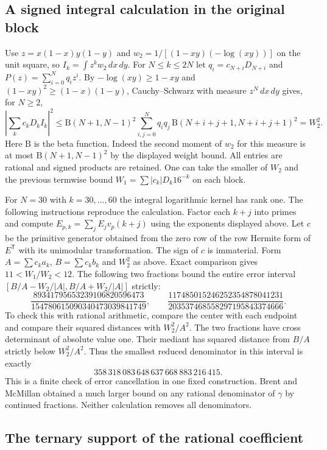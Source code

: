 \documentclass[11pt,a4paper]{article}
\theoremstyle{definition}\newtheorem{definition}[theorem]{Definition}\newtheorem{example}[theorem]{Example}
\theoremstyle{remark}\newtheorem{remark}[theorem]{Remark}
\begin{document}
\subsection{A signed integral calculation in the original block}
Use $z=x(1-x)y(1-y)$ and $w_2=1/[(1-xy)(-\log(xy))]$ on the unit square, so $I_k=\int z^k w_2\,dx\,dy$. For $N\le k\le2N$ let $q_i=c_{N+i}D_{N+i}$ and $P(z)=\sum_{i=0}^Nq_i z^i$. By $-\log(xy)\ge1-xy$ and $(1-xy)^2\ge(1-x)(1-y)$, Cauchy--Schwarz with measure $z^N\,dx\,dy$ gives, for $N\ge2$,
\[
 \left|\sum_k c_kD_k I_k\right|^2
 \le \mathrm B(N+1,N-1)^2
 \sum_{i,j=0}^N q_iq_j\,\mathrm B(N+i+j+1,N+i+j+1)^2
 = W_2^2 .
\]
Here $\mathrm B$ is the beta function. Indeed the second moment of $w_2$ for this measure is at most $\mathrm B(N+1,N-1)^2$ by the displayed weight bound. All entries are rational and signed products are retained. One can take the smaller of $W_2$ and the previous termwise bound $W_1=\sum |c_k|D_k16^{-k}$ on each block.

For $N=30$ with $k=30,\ldots,60$ the integral logarithmic kernel has rank one. The following instructions reproduce the calculation. Factor each $k+j$ into primes and compute $E_{p,k}=\sum_j E_jv_p(k+j)$ using the exponents displayed above. Let $c$ be the primitive generator obtained from the zero row of the row Hermite form of $E^{\mathsf T}$ with its unimodular transformation. The sign of $c$ is immaterial. Form $A=\sum c_ka_k$, $B=\sum c_k b_k$ and $W_2^2$ as above. Exact comparison gives $11<W_1/W_2<12$. The following two fractions bound the entire error interval $[B/A-W_2/|A|,B/A+W_2/|A|]$ strictly:
\[
 \frac{89341795653239106820596473}{154780615090340473039841749},
 \qquad
 \frac{117485015246252354878041231}{203537468558297195843374666}.
\]
To check this with rational arithmetic, compare the center with each endpoint and compare their squared distances with $W_2^2/A^2$. The two fractions have cross determinant of absolute value one. Their mediant has squared distance from $B/A$ strictly below $W_2^2/A^2$. Thus the smallest reduced denominator in this interval is exactly
\[
 358\,318\,083\,648\,637\,668\,883\,216\,415 .
\]
This is a finite check of error cancellation in one fixed construction. Brent and McMillan obtained a much larger bound on any rational denominator of $\gamma$ by continued fractions. Neither calculation removes all denominators.

\subsection{The ternary support of the rational coefficient}
\end{document}
